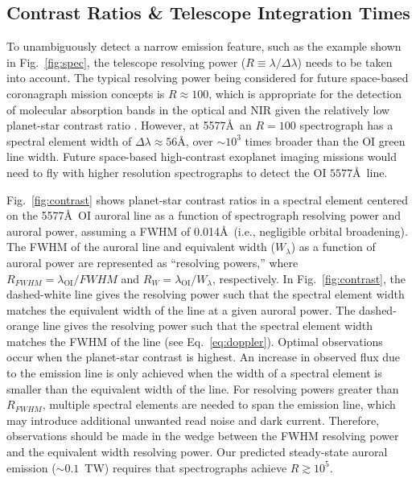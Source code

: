 \documentclass{emulateapj}
\newcommand{\XXX}[1]{#1}      %
\begin{document}
\subsection{Contrast Ratios \& Telescope Integration Times}
\label{sec:int_times}

To unambiguously detect a narrow emission feature, such as the example shown in Fig.\ \ref{fig:spec}, the telescope resolving power ($R \equiv \lambda / \Delta \lambda$) needs to be taken into account. The typical resolving power being considered for future space-based coronagraph mission concepts is $R \approx 100$, which is appropriate for the detection of molecular absorption bands in the optical and NIR given the relatively low planet-star contrast ratio \citep{Robinson2016}. However, at 5577\AA\ an $R=100$ spectrograph has a spectral element width of $\Delta \lambda \approx 56$\AA, over ${\sim} 10^3$ times broader than the OI green line width. Future space-based high-contrast exoplanet imaging missions would need to fly with higher resolution spectrographs to detect the OI $5577$\AA\ line.

Fig.~\ref{fig:contrast} shows planet-star contrast ratios in a spectral element centered on the 5577\AA\ OI auroral line as a function of spectrograph resolving power and auroral power, assuming a FWHM of 0.014\AA\ (i.e., negligible orbital broadening). The FWHM of the auroral line and equivalent width ($W_{\lambda}$) as a function of auroral power are represented as ``resolving powers,'' where $R_{FWHM} = \lambda_{\text{OI}} / FWHM$ and $R_{W} = \lambda_{\text{OI}} / W_{\lambda}$, respectively. \XXX{In Fig.~\ref{fig:contrast}, the dashed-white line gives the resolving power such that the spectral element width matches the equivalent width of the line at a given auroral power.  The dashed-orange line gives the resolving power such that the spectral element width matches the FWHM of the line (see Eq.~\ref{eq:doppler}).} \XXX{Optimal observations occur when the planet-star contrast is highest. An increase in observed flux due to the emission line is only achieved when the width of a spectral element is smaller than the equivalent width of the line.} For resolving powers greater than $R_{FWHM}$, multiple spectral elements are needed to span the emission line, which may introduce additional unwanted read noise and dark current. Therefore, observations should be made in the wedge between the FWHM resolving power and the equivalent width resolving power.  Our predicted steady-state auroral emission (${\sim}0.1$~TW) requires that spectrographs achieve $R \gtrsim 10^5$.
\end{document}
